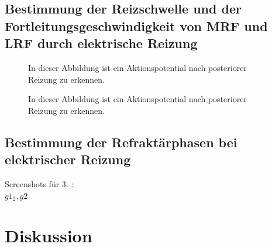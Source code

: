 \documentclass[11pt]{article}
\begin{document}
\subsection{Bestimmung der Reizschwelle und der Fortleitungsgeschwindigkeit von MRF und LRF durch elektrische Reizung}
\begin{figure}[H]
\caption{In dieser Abbildung ist ein Aktionspotential nach posteriorer Reizung zu erkennen.}
\label{g1-2}
\end{figure}
\begin{figure}[H]
\caption{In dieser Abbildung ist ein Aktionspotential nach posteriorer Reizung zu erkennen.}
\label{g2}
\end{figure}

\subsection{Bestimmung der Refraktärphasen bei elektrischer Reizung}

Screenshots für 3. : \\
$g1_2, g2$ \\

\section{Diskussion}
\end{document}
